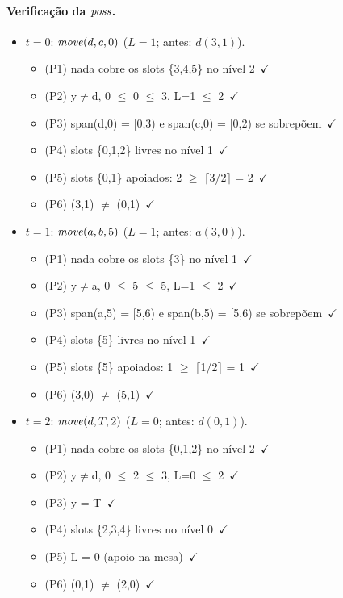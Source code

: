 \paragraph{Verificação da $\mathit{poss}$.}\begin{itemize}
\item $t=0$: $\mathit{move}(d,c,0)$ ($L=1$; antes: $d(3,1)$).
\begin{itemize}
\item (P1) nada cobre os slots \{3,4,5\} no nível 2\ $\checkmark$
\item (P2) y$\neq$d, 0 $\le$ 0 $\le$ 3, L=1 $\le$ 2\ $\checkmark$
\item (P3) span(d,0) = [0,3) e span(c,0) = [0,2) se sobrepõem\ $\checkmark$
\item (P4) slots \{0,1,2\} livres no nível 1\ $\checkmark$
\item (P5) slots \{0,1\} apoiados: 2 $\ge$ $\lceil$3/2$\rceil$ = 2\ $\checkmark$
\item (P6) (3,1) $\neq$ (0,1)\ $\checkmark$
\end{itemize}
\item $t=1$: $\mathit{move}(a,b,5)$ ($L=1$; antes: $a(3,0)$).
\begin{itemize}
\item (P1) nada cobre os slots \{3\} no nível 1\ $\checkmark$
\item (P2) y$\neq$a, 0 $\le$ 5 $\le$ 5, L=1 $\le$ 2\ $\checkmark$
\item (P3) span(a,5) = [5,6) e span(b,5) = [5,6) se sobrepõem\ $\checkmark$
\item (P4) slots \{5\} livres no nível 1\ $\checkmark$
\item (P5) slots \{5\} apoiados: 1 $\ge$ $\lceil$1/2$\rceil$ = 1\ $\checkmark$
\item (P6) (3,0) $\neq$ (5,1)\ $\checkmark$
\end{itemize}
\item $t=2$: $\mathit{move}(d,T,2)$ ($L=0$; antes: $d(0,1)$).
\begin{itemize}
\item (P1) nada cobre os slots \{0,1,2\} no nível 2\ $\checkmark$
\item (P2) y$\neq$d, 0 $\le$ 2 $\le$ 3, L=0 $\le$ 2\ $\checkmark$
\item (P3) y = T\ $\checkmark$
\item (P4) slots \{2,3,4\} livres no nível 0\ $\checkmark$
\item (P5) L = 0 (apoio na mesa)\ $\checkmark$
\item (P6) (0,1) $\neq$ (2,0)\ $\checkmark$

\end{itemize}
\end{itemize}
